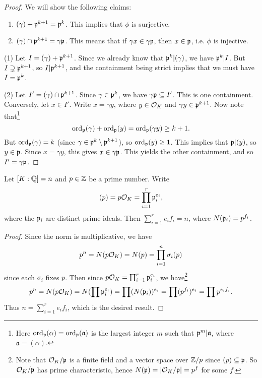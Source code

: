 \begin{proof}
  We will show the following claims:
  \begin{enumerate}
    \item $(\gamma) + \mathfrak{p}^{k + 1} = \mathfrak{p}^k$. This
      implies that $\phi$ is surjective.
    \item $(\gamma) \cap \mathfrak{p}^{k + 1} = \gamma \mathfrak{p}$.
      This means that if $\gamma x \in \gamma \mathfrak{p}$,
      then $x \in \mathfrak{p}$, i.e. $\phi$ is injective.
  \end{enumerate}
  (1) Let $I = (\gamma) + \mathfrak{p}^{k + 1}$. Since we already
  know that $\mathfrak{p}^k | (\gamma)$, we have $\mathfrak{p}^k | I$.
  But $I \supsetneq \mathfrak{p}^{k + 1}$, so $I | \mathfrak{p}^{k + 1}$,
  and the containment being strict implies that
  we must have $I = \mathfrak{p}^k$.

  (2) Let $I' = (\gamma) \cap \mathfrak{p}^{k + 1}$. Since
  $\gamma \in \mathfrak{p}^k$, we have $\gamma \mathfrak{p} \subseteq I'$.
  This is one containment.
  Conversely, let $x \in I'$. Write $x = \gamma y$,
  where $y \in \mathcal{O}_K$ and $\gamma y \in \mathfrak{p}^{k + 1}$.
  Now note that\footnote{Here $\operatorname{ord}_{\mathfrak{p}}(\alpha) = \operatorname{ord}_{\mathfrak{p}}(\mathfrak{a})$ is the largest integer $m$ such that $\mathfrak{p}^m | \mathfrak{a}$, where $\mathfrak{a} = (\alpha)$.}
  \[
    \operatorname{ord}_{\mathfrak{p}}(\gamma) + \operatorname{ord}_{\mathfrak{p}}(y) = \operatorname{ord}_{\mathfrak{p}}(\gamma y) \ge k + 1.
  \]
  But $\operatorname{ord}_{\mathfrak{p}}(\gamma) = k$ (since $\gamma \in \mathfrak{p}^k \setminus \mathfrak{p}^{k + 1}$),
  so $\operatorname{ord}_{\mathfrak{p}}(y) \ge 1$. This implies
  that $\mathfrak{p} | (y)$, so $y \in \mathfrak{p}$. Since
  $x = \gamma y$, this gives $x \in \gamma \mathfrak{p}$.
  This yields the other containment, and so
  $I' = \gamma \mathfrak{p}$.
\end{proof}

\begin{corollary}
  Let $[K : \mathbb{Q}] = n$ and $p \in \mathbb{Z}$ be a prime number.
  Write
  \[
    (p) = p\mathcal{O}_K = \prod_{i = 1}^r \mathfrak{p}_i^{e_i},
  \]
  where the $\mathfrak{p}_i$ are distinct prime ideals. Then
  $\sum_{i = 1}^r e_i f_i = n$,
  where $N(\mathfrak{p}_i) = p^{f_i}$.
\end{corollary}

\begin{proof}
  Since the norm is multiplicative, we have
  \[
    p^n = N(p \mathcal{O}_K) = N(p) = \prod_{i = 1}^n \sigma_i(p)
  \]
  since each $\sigma_i$ fixes $p$. Then since
  $p \mathcal{O}_K = \prod_{i = 1}^r \mathfrak{p}_i^{e_i}$, we have\footnote{Note that $\mathcal{O}_K / \mathfrak{p}$ is a finite field and a vector space over $\mathbb{Z} / p$ since $(p) \subseteq \mathfrak{p}$. So $\mathcal{O}_K / \mathfrak{p}$ has prime characteristic, hence $N(\mathfrak{p}) = |\mathcal{O}_K / \mathfrak{p}| = p^{f}$ for some $f$.}
  \[
    p^n = N(p \mathcal{O}_K) = N(\prod \mathfrak{p}_i^{e_i})
    = \prod (N(\mathfrak{p}_i))^{e_i}
    = \prod (p^{f_i})^{e_i}
    = \prod p^{e_i f_i}.
  \]
  Thus $n = \sum_{i = 1}^r e_i f_i$, which is the
  desired result.
\end{proof}

